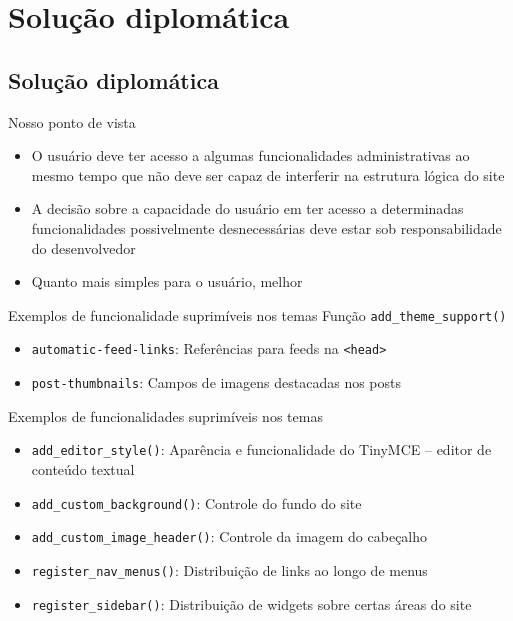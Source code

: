 \documentclass{beamer}
\begin{document}
\section{Solução diplomática}
\subsection{Solução diplomática}

\begin{frame}{Nosso ponto de vista}
\begin{itemize}
  \pause \item O usuário deve ter acesso a algumas funcionalidades
    administrativas ao mesmo tempo que não deve ser capaz de interferir na
    estrutura lógica do site
  \pause \item A decisão sobre a capacidade do usuário em ter acesso a
    determinadas funcionalidades possivelmente desnecessárias deve estar sob
    responsabilidade do desenvolvedor
  \pause \item Quanto mais simples para o usuário, melhor
\end{itemize}
\end{frame}

\begin{frame}{Exemplos de funcionalidade suprimíveis nos temas}
Função \texttt{add\_theme\_support()}
\begin{itemize}
  \pause \item \texttt{automatic-feed-links}: Referências para feeds na
    \texttt{<head>}
  \pause \item \texttt{post-thumbnails}: Campos de imagens destacadas nos posts
\end{itemize}
\end{frame}

\begin{frame}{Exemplos de funcionalidades suprimíveis nos temas}
\begin{itemize}
  \pause \item \texttt{add\_editor\_style()}: Aparência e funcionalidade do TinyMCE --
    editor de conteúdo textual
  \pause \item \texttt{add\_custom\_background()}: Controle do fundo do site
  \pause \item \texttt{add\_custom\_image\_header()}: Controle da imagem do
    cabeçalho
  \pause \item \texttt{register\_nav\_menus()}: Distribuição de links ao longo
    de menus
  \pause \item \texttt{register\_sidebar()}: Distribuição de widgets sobre
  certas áreas do site
\end{itemize}
\end{frame}
\end{document}
